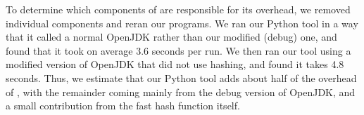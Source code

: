 To determine which components of \jcupid are responsible for its overhead, we
removed individual components and reran our programs. We ran our Python tool in
a way that it called a normal OpenJDK rather than our modified (debug) one, and
found that it took on average 3.6 seconds per run. We then ran our tool using a
modified version of OpenJDK that did not use hashing, and found it takes 4.8
seconds. Thus, we estimate that our Python tool adds about half of the overhead
of \jcupid,
with the remainder coming mainly from the debug version of OpenJDK, and a small
contribution from the fast hash function itself.

%
%
